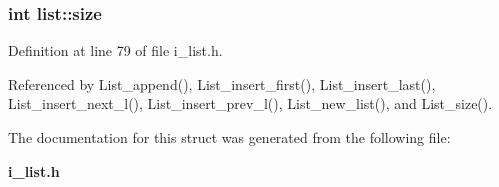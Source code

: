 \subsubsection{\setlength{\rightskip}{0pt plus 5cm}int \bf{list::size}}\label{structlist_3b03adad0c0429bae9493667ff366dc2}




Definition at line 79 of file i\_\-list.h.

Referenced by List\_\-append(), List\_\-insert\_\-first(), List\_\-insert\_\-last(), List\_\-insert\_\-next\_\-l(), List\_\-insert\_\-prev\_\-l(), List\_\-new\_\-list(), and List\_\-size().

The documentation for this struct was generated from the following file:\begin{CompactItemize}
\item 
\bf{i\_\-list.h}\end{CompactItemize}
